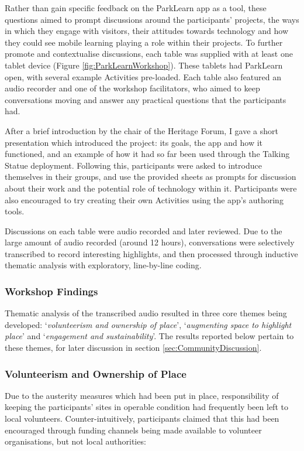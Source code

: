 Rather than gain specific feedback on the ParkLearn app as a tool, these questions aimed to prompt discussions around the participants' projects, the ways in which they engage with visitors, their attitudes towards technology and how they could see mobile learning playing a role within their projects. To further promote and contextualise discussions, each table was supplied with at least one tablet device (Figure \ref{fig:ParkLearnWorkshop}). These tablets had ParkLearn open, with several example Activities pre-loaded. Each table also featured an audio recorder and one of the workshop facilitators, who aimed to keep conversations moving and answer any practical questions that the participants had.

After a brief introduction by the chair of the Heritage Forum, I gave a short presentation which introduced the project: its goals, the app and how it functioned, and an example of how it had so far been used through the Talking Statue deployment. Following this, participants were asked to introduce themselves in their groups, and use the provided sheets as prompts for discussion about their work and the potential role of technology within it. Participants were also encouraged to try creating their own Activities using the app's authoring tools.

Discussions on each table were audio recorded and later reviewed. Due to the large amount of audio recorded (around 12 hours), conversations were selectively transcribed to record interesting highlights, and then processed through inductive thematic analysis with exploratory, line-by-line coding. 

\subsubsection{Workshop Findings}

Thematic analysis of the transcribed audio resulted in three core themes being developed: `\textit{volunteerism and ownership of place}', `\textit{augmenting space to highlight place}' and `\textit{engagement and sustainability}'. The results reported below pertain to these themes, for later discussion in section \ref{sec:CommunityDiscussion}.

\subsubsection{Volunteerism and Ownership of Place}
Due to the austerity measures which had been put in place, responsibility of keeping the participants' sites in operable condition had frequently been left to local volunteers. Counter-intuitively, participants claimed that this had been encouraged through funding channels being made available to volunteer organisations, but not local authorities: 

